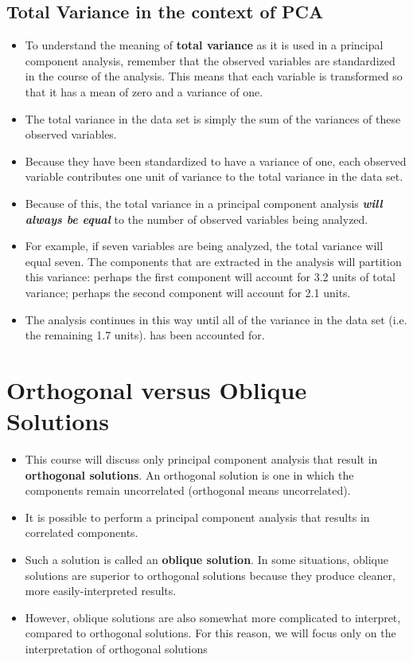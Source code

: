 \documentclass[]{article}
\begin{document}
\subsection{Total Variance in the context of PCA}
\begin{itemize}
\item To understand the meaning of \textbf{total
	variance} as it is used in a principal component analysis, remember that the observed
variables are standardized in the course of the analysis.  This means that each variable is
transformed so that it has a mean of zero and a variance of one.
\item 
The total variance in the
data set is simply the sum of the variances of these observed variables. 
\item Because they have
been standardized to have a variance of one, each observed variable contributes one unit of
variance to the total variance in the data set. 
\item  Because of this, the total variance in a
principal component analysis \textbf{\emph{will always be equal}} to the number of observed variables
being analyzed.
\item 
For example, if seven variables are being analyzed, the total variance will
equal seven.  The components that are extracted in the analysis will partition this variance:
perhaps the first component will account for 3.2 units of total variance; perhaps the second
component will account for 2.1 units.
\item  The analysis continues in this way until all of the
variance in the data set (i.e. the remaining 1.7 units). has been accounted for.
\end{itemize}
\newpage
\section{Orthogonal versus Oblique Solutions}
\begin{itemize}

\item This course will discuss only principal component analysis that result in \textbf{orthogonal solutions}.
An orthogonal solution is one in which the components remain uncorrelated (orthogonal means
uncorrelated).

\item It is possible to perform a principal component analysis that results in correlated components.
\item Such a solution is called an \textbf{oblique solution}.  In some situations, oblique solutions are superior
to orthogonal solutions because they produce cleaner, more easily-interpreted results.
\item 
However, oblique solutions are also somewhat more complicated to interpret, compared to
orthogonal solutions.  For this reason, we will focus only on the interpretation of orthogonal solutions
\end{itemize}
\newpage
\end{document}
